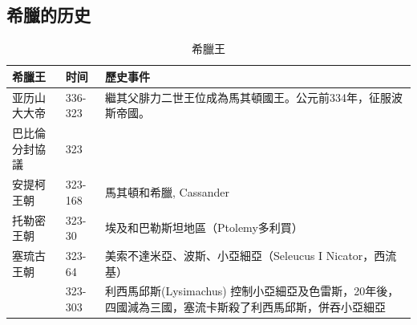 \subsection{希臘的历史}
\begin{table}[!hbp]
\centering 
\begin{tabular}{|p{2.7cm}|p{1.4cm}|p{11.2cm}|}
\hline
\hline
希臘王 & 时间 & 歷史事件 \\\hline
亚历山大大帝&336-323  & 繼其父腓力二世王位成為馬其頓國王。公元前334年，征服波斯帝國。 \\\hline
巴比倫分封協議&323&  \\\hline
安提柯王朝&323-168&馬其頓和希臘, Cassander \\\hline
托勒密王朝 &323-30&埃及和巴勒斯坦地區（Ptolemy多利買） \\\hline
塞琉古王朝 &323-64&美索不達米亞、波斯、小亞細亞（Seleucus I Nicator，西流基） \\\hline
&323-303&利西馬邱斯(Lysimachus) 控制小亞細亞及色雷斯，20年後，四國減為三國，塞流卡斯殺了利西馬邱斯，併吞小亞細亞\\\hline
 \end{tabular}
\caption{希臘王\cite{繼業者}}
\end{table}

 

